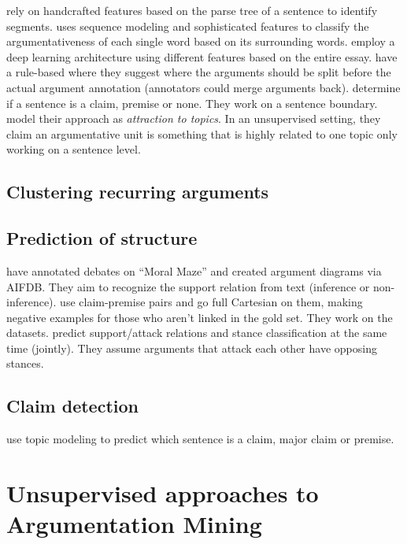 \documentclass[a4paper,10pt]{article}
\begin{document}
\cite{persing2016end} rely on handcrafted features based on the parse tree
of a sentence to identify segments. 
\cite{stab2017argumentative} uses sequence modeling and sophisticated
features to classify the argumentativeness of each single word based on
its surrounding words. 
\cite{eger2017neural} employ a deep learning architecture using different
features based on the entire essay.
\cite{al2016news} have a rule-based where they suggest where the arguments
should be split before the actual argument annotation (annotators could
merge arguments back).
\cite{Aker2017} determine if a sentence is a claim,
premise or none. They work on a sentence boundary. 
\cite{Ferrara2017} model their approach as \emph{attraction to topics}. 
In an unsupervised setting, they claim an argumentative unit 
is something that is highly related to one topic only working on a 
sentence level. 

\subsection{Clustering recurring arguments}

\subsection{Prediction of structure}

\cite{Lawrence2017} have annotated debates on ``Moral Maze'' and created
argument diagrams via AIFDB\@. They aim to recognize the support relation
from text (inference or non-inference).
\cite{Aker2017} use claim-premise pairs and go full Cartesian on them,
making negative examples for those who aren't linked in the gold set. They
work on the~\cite{stab2017parsing, aharoni2014benchmark} datasets.
\cite{Hou2017} predict support/attack relations and stance classification at the same
time (jointly). They assume arguments that attack each other 
have opposing stances. 

\subsection{Claim detection}

\cite{Ferrara2017} use topic modeling to predict which sentence is a 
claim, major claim or premise. 

\section{Unsupervised approaches to Argumentation Mining}
\end{document}

